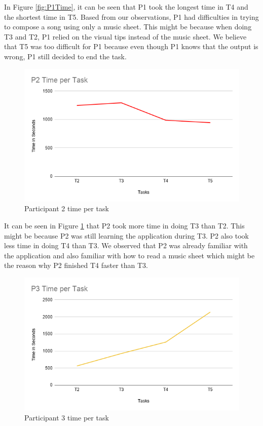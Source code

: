 In Figure \ref{fig:P1Time}, it can be seen that P1 took the longest time in T4 and the shortest time in T5. Based from our observations, P1 had difficulties in trying to compose a song using only a music sheet. This might be because when doing T3 and T2, P1 relied on the visual tips instead of the music sheet. We believe that T5 was too difficult for P1 because even though P1 knows that the output is wrong, P1 still decided to end the task.

\begin{figure}[H]
    \centering
    \includegraphics[width=15cm]{figures/Results/P2Time.png}
    \caption{Participant 2 time per task}
    \label{fig:P2Time}
\end{figure}

It can be seen in Figure \ref{fig:P2Time} that P2 took more time in doing T3 than T2. This might be because P2 was still learning the application during T3. P2 also took less time in doing T4 than T3. We observed that P2 was already familiar with the application and also familiar with how to read a music sheet which might be the reason why P2 finished T4 faster than T3. 

\begin{figure}[H]
    \centering
    \includegraphics[width=15cm]{figures/Results/P3Time.png}
    \caption{Participant 3 time per task}
    \label{fig:P3Time}
\end{figure}

